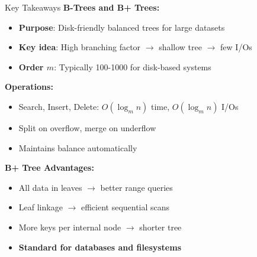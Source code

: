 \documentclass[aspectratio=169]{beamer}
\begin{document}
\begin{frame}{Key Takeaways}
  \textbf{B-Trees and B+ Trees:}
  \begin{itemize}
    \item \textbf{Purpose}: Disk-friendly balanced trees for large datasets
    \item \textbf{Key idea}: High branching factor $\rightarrow$ shallow tree $\rightarrow$ few I/Os
    \item \textbf{Order $m$}: Typically 100-1000 for disk-based systems
  \end{itemize}

  \vspace{0.3cm}
  \textbf{Operations:}
  \begin{itemize}
    \item Search, Insert, Delete: $O(\log_m n)$ time, $O(\log_m n)$ I/Os
    \item Split on overflow, merge on underflow
    \item Maintains balance automatically
  \end{itemize}

  \vspace{0.3cm}
  \textbf{B+ Tree Advantages:}
  \begin{itemize}
    \item All data in leaves $\rightarrow$ better range queries
    \item Leaf linkage $\rightarrow$ efficient sequential scans
    \item More keys per internal node $\rightarrow$ shorter tree
    \item \textbf{Standard for databases and filesystems}
  \end{itemize}
\end{frame}
\end{document}
